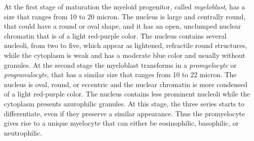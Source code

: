At the first stage of maturation the myeloid progenitor, called \textit{myeloblast}, has a size that ranges from 10 to 20 micron. The nucleus is large and centrally round, that could have a round or oval shape, and it has an open, unclumped nuclear chromatin that is of a light red-purple color. The nucleus contains several nucleoli, from two to five, which appear as lightened, refractile round structures, while the cytoplasm is weak and has a moderate blue color and usually without granules. At the second stage the myeloblast transforms in a \textit{promyelocyte} or \textit{progranulocyte}, that has a similar size that ranges from 10 to 22 micron. The nucleus is oval, round, or eccentric and the nuclear chromatin is more condensed of a light red-purple color. The nucleus contains less prominent nucleoli while the cytoplasm presents azurophilic granules. At this stage, the three series starts to differentiate, even if they preserve a similar appearance. Thus the promyelocyte gives rise to a unique myelocyte that can either be eosinophilic, basophilic, or neutrophilic.
